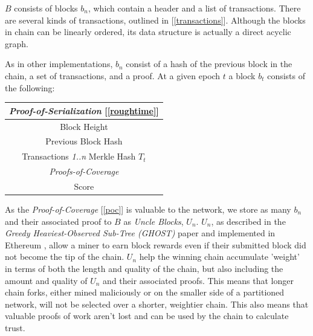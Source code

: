 \documentclass[letterpaper,11pt]{article}
\begin{document}
$\mathit{B}$ consists of blocks $\mathit{b_n}$, which contain a header and a list of transactions. There are several kinds of transactions, outlined in [\ref{transactions}]. Although the blocks in chain can be linearly ordered, its data structure is actually a direct acyclic graph.\newline

As in other implementations, $\mathit{b_n}$ consist of a hash of the previous block in the chain, a set of transactions, and a proof. At a given epoch $\mathit{t}$ a block $\mathit{b_t}$ consists of the following:

\begin{center}
	\begin{tabular}{|c|}
		\hline
		 \textit{Proof-of-Serialization} [\ref{roughtime}]\\
		 \hline
		 Block Height \\
		\hline
		 Previous Block Hash \\
		 \hline
		 Transactions \textit{1..n} Merkle Hash $\mathit{T_t}$ \\
		 \hline
		 \textit{Proofs-of-Coverage} \\
		 \hline
		 Score \\
		 \hline
	\end{tabular}
\end{center}

As the \textit{Proof-of-Coverage} [\ref{poc}] is valuable to the network, we store as many $\mathit{b_n}$ and their associated proof to $\mathit{B}$ as \textit{Uncle Blocks}, $\mathit{U_n}$. $\mathit{U_n}$, as described in the \textit{Greedy Heaviest-Observed Sub-Tree (GHOST)} \cite{ghost} paper and implemented in Ethereum \cite{ethereum}, allow a miner to earn block rewards even if their submitted block did not become the tip of the chain. $\mathit{U_n}$ help the winning chain accumulate 'weight' in terms of both the length and quality of the chain, but also including the amount and quality of $\mathit{U_n}$ and their associated proofs. This means that longer chain forks, either mined maliciously or on the smaller side of a partitioned network, will not be selected over a shorter, weightier chain. This also means that valuable proofs of work aren't lost and can be used by the chain to calculate trust.\newline
\end{document}
